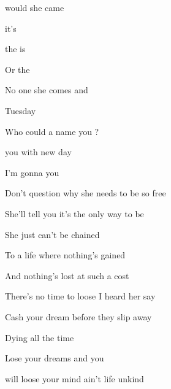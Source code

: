 

\zs
{} would    she came   

    it's   

 the  is 

Or  the  

No one    she comes and   
\ks

\zr
{}  Tuesday

Who could  a name  you ?

 you  with  new day

 I'm gonna  you 
\kr

\zs
Don't question why she needs to be so free

She'll tell you it's the only way to be

She just can't be chained

To a life where nothing's gained

And nothing's lost at such a cost
\ks

\zr  \kr

\zs
There's no time to loose I heard her say

Cash your dream before they slip away

Dying all the time

Lose your dreams and you

will loose your mind ain't life unkind
\ks

\kp





